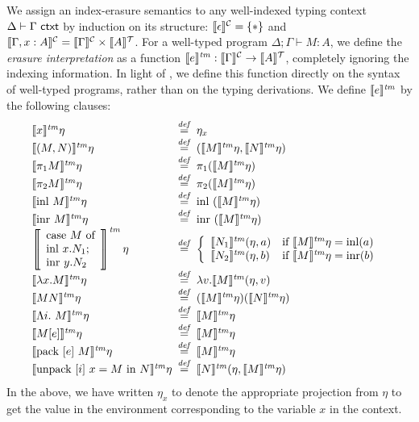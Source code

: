 We assign an index-erasure semantics to any well-indexed typing
context $\Delta \vdash \Gamma \textsf{ ctxt}$ by induction on its structure:
$\llbracket \epsilon \rrbracket^{\mathcal{C}} = \{*\}$ and $\llbracket \Gamma, x : A \rrbracket^{\mathcal{C}} =
\llbracket \Gamma \rrbracket^{\mathcal{C}} \times \llbracket A \rrbracket^{\mathcal{T}}$. For a well-typed program $\Delta;
\Gamma \vdash M : A$, we define the \emph{erasure interpretation} as a
function $\llbracket e \rrbracket^{\mathit{tm}} : \llbracket \Gamma \rrbracket^{\mathcal{C}} \to \llbracket A \rrbracket^{\mathcal{T}}$, completely
ignoring the indexing information. In light of
, we define this function directly on
the syntax of well-typed programs, rather than on the typing
derivations. We define $\llbracket e \rrbracket^{\mathit{tm}}$ by the following clauses:
\begin{displaymath}
  \begin{array}{@{\hspace{0em}}l@{\hspace{0.5em}}c@{\hspace{0.5em}}l}
    \tmSem{x}\eta & \isDefinedAs & \eta_x \\
    \tmSem{(M,N)}\eta & \isDefinedAs & (\tmSem{M}\eta, \tmSem{N}\eta) \\
    \tmSem{\pi_1M}\eta & \isDefinedAs & \pi_1(\tmSem{M}\eta) \\
    \tmSem{\pi_2M}\eta & \isDefinedAs & \pi_2(\tmSem{M}\eta) \\
    \tmSem{\mathrm{inl}\ M}\eta & \isDefinedAs & \mathrm{inl}\ (\tmSem{M}\eta) \\
    \tmSem{\mathrm{inr}\ M}\eta & \isDefinedAs & \mathrm{inr}\ (\tmSem{M}\eta) \\
    \left\llbracket
      \begin{array}{l}
        \textrm{case}\ M\ \textrm{of}\\
        \textrm{inl}\ x.N_1;\\
        \textrm{inr}\ y.N_2
      \end{array}\right\rrbracket^{\mathit{tm}}\eta & \isDefinedAs &
    \left\{
      \begin{array}{ll}
        \tmSem{N_1}(\eta,a) & \textrm{if }\tmSem{M}\eta = \mathrm{inl}(a) \\
        \tmSem{N_2}(\eta,b) & \textrm{if }\tmSem{M}\eta = \mathrm{inr}(b)
      \end{array}
    \right. \\
    \tmSem{\lambda x. M}\eta & \isDefinedAs & \lambda v. \tmSem{M}(\eta, v) \\
    \tmSem{M N}\eta & \isDefinedAs & (\tmSem{M}\eta) (\tmSem{N}\eta) \\
    \tmSem{\Lambda i.\ M}\eta & \isDefinedAs & \tmSem{M}\eta \\
    \tmSem{M[e]}\eta & \isDefinedAs & \tmSem{M}\eta \\
    \tmSem{\mathrm{pack}\ [e]\ M}\eta & \isDefinedAs & \tmSem{M}\eta \\
    \tmSem{\mathrm{unpack}\ [i]\ x = M\ \mathrm{in}\ N}\eta & \isDefinedAs & \tmSem{N}(\eta, \tmSem{M}\eta)
  \end{array}
\end{displaymath}
In the above, we have written $\eta_x$ to denote the appropriate
projection from $\eta$ to get the value in the environment
corresponding to the variable $x$ in the context.

